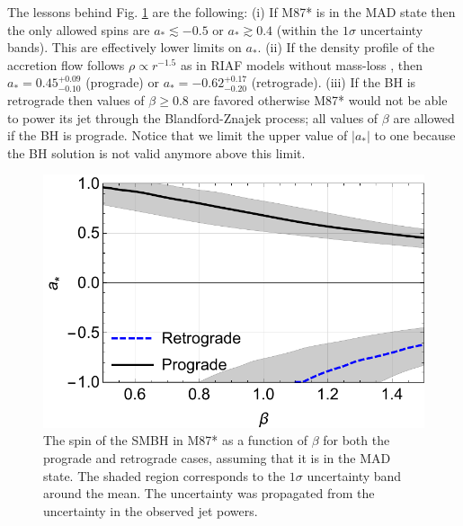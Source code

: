 \documentclass[twocolumn, linenumbers]{aastex62} %
\begin{document}
The lessons behind Fig. \ref{spins} are the following: (i) If M87* is in the MAD state then the only allowed spins are $a_* \lesssim -0.5$ or $a_* \gtrsim 0.4$ (within the $1\sigma$ uncertainty bands). This are effectively lower limits on $a_*$. (ii) If the density profile of the accretion flow follows $\rho \propto r^{-1.5}$ as in RIAF models without mass-loss , then $a_* = 0.45^{+0.09}_{-0.10}$ (prograde) or $a_* = -0.62^{+0.17}_{-0.20}$ (retrograde). (iii) If the BH is retrograde then values of $\beta \geq 0.8$ are favored otherwise M87* would not be able to power its jet through the Blandford-Znajek process; all values of $\beta$ are allowed if the BH is prograde.
Notice that we limit the upper value of $|a_*|$ to one because the BH solution is not valid anymore above this limit.

\begin{figure}[h]
\centering
\includegraphics[width=\linewidth]{figures/spins-MAD.pdf}
\caption{The spin of the SMBH in M87* as a function of $\beta$ for both the prograde and retrograde cases, assuming that it is in the MAD state. The shaded region corresponds to the $1\sigma$ uncertainty band around the mean. The uncertainty was propagated from the uncertainty in the observed jet powers. }
\label{spins}
\end{figure}
\end{document}
